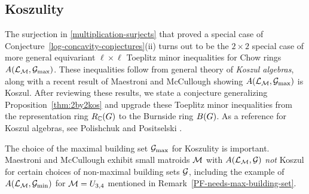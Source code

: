 \subsection{Koszulity}

The surjection in \eqref{multiplication-surjects} that proved a special case of Conjecture~\ref{log-concavity-conjectures}(ii) turns out to be the $2 \times 2$ special case of more general equivariant $\ell \times \ell$ Toeplitz minor inequalities for Chow rings $A(\mathcal{L}_{\mathcal{M}},\mathcal{G}_{\max})$.
These inequalities follow from general theory of
{\it Koszul algebras}, along with a recent result of Maestroni and McCullough \cite{MaestroniMcCullough} showing $A(\mathcal{L}_{\mathcal{M}},\mathcal{G}_{\max})$ is Koszul.  After reviewing these
results, we state a conjecture generalizing Proposition~\ref{thm:2by2kos} and upgrade these Toeplitz minor inequalities from the representation ring $R_{\mathbb{C}}(G)$ to the Burnside ring $B(G)$.  As a reference for Koszul algebras, see
Polishchuk and Positselski \cite{PP}.

\begin{remark}
    The choice of the maximal building set $\mathcal{G}_{\max}$ for Koszulity is important. Maestroni and McCullough  \cite[Ex.~6.2, 6.3]{MaestroniMcCullough} exhibit small matroids $\mathcal{M}$ with $A(\mathcal{L}_{\mathcal{M}},\mathcal{G})$
    {\it not} Koszul for certain choices of non-maximal
    building sets $\mathcal{G}$, including the example of 
    $A(\mathcal{L}_{\mathcal{M}},\mathcal{G}_{\min})$ for $\mathcal{M}=U_{3,4}$ mentioned in
    Remark~\ref{PF-needs-max-building-set}.
\end{remark}


